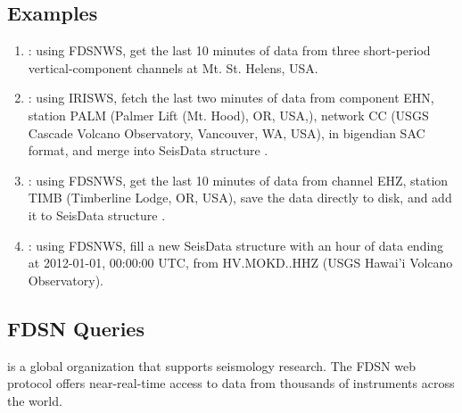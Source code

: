 \documentclass[letterpaper,11pt,english]{sphinxmanual}
\begin{document}
\subsection{Examples}
\label{\detokenize{src/Web/webclients:examples}}\begin{enumerate}
\def\theenumi{\arabic{enumi}}
\def\labelenumi{\theenumi .}
\makeatletter\def\p@enumii{\p@enumi \theenumi .}\makeatother
\item {} 
: using FDSNWS, get the last 10 minutes of data from three short-period vertical-component channels at Mt. St. Helens, USA.

\item {} 
: using IRISWS, fetch the last two minutes of data from component EHN, station PALM (Palmer Lift (Mt. Hood), OR, USA,), network CC (USGS Cascade Volcano Observatory, Vancouver, WA, USA), in bigendian SAC format, and merge into SeisData structure .

\item {} 
: using FDSNWS, get the last 10 minutes of data from channel EHZ, station TIMB (Timberline Lodge, OR, USA), save the data directly to disk, and add it to SeisData structure .

\item {} 
: using FDSNWS, fill a new SeisData structure  with an hour of data ending at 2012-01-01, 00:00:00 UTC, from HV.MOKD..HHZ (USGS Hawai’i Volcano Observatory).

\end{enumerate}


\subsection{FDSN Queries}
\label{\detokenize{src/Web/webclients:fdsn-queries}}\label{\detokenize{src/Web/webclients:fdsnws}}
 is a global organization that supports seismology research. The FDSN web protocol offers near-real-time access to data from thousands of instruments across the world.
\end{document}

